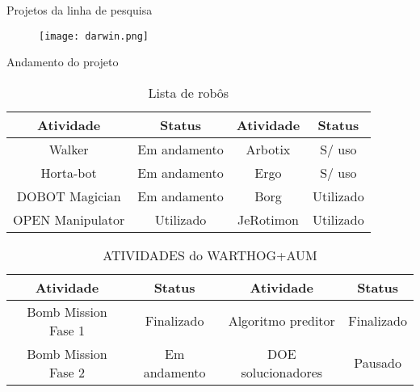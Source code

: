 \begin{frame}[t]{Projetos da linha de pesquisa }
    \begin{figure}
        \texttt{[image: darwin.png]}
    \end{figure}
\end{frame}
  \begin{frame}[c]{Andamento do projeto}
    \begin{table}[ht!]
            \caption{Lista de robôs}
            \begin{tabular}{|c|c|c|c|} \hline
                \textbf{Atividade}&\textbf{Status}&\textbf{Atividade}&\textbf{Status}\\\hline
                Walker           &Em andamento &  Arbotix & S/ uso\\ \hline
                Horta-bot        &Em andamento &  Ergo & S/ uso\\ \hline
                DOBOT Magician   &Em andamento &  Borg  & Utilizado\\ \hline
                OPEN Manipulator &Utilizado       &  JeRotimon & Utilizado\\ \hline
            \end{tabular}
        \end{table}
        \begin{table}[ht!]
                \caption{ATIVIDADES do WARTHOG+AUM}
                \begin{tabular}{|c|c|c|c|} \hline
                    \textbf{Atividade}&\textbf{Status}&\textbf{Atividade}&\textbf{Status}\\\hline
                    Bomb Mission Fase 1 &Finalizado & Algoritmo preditor  &Finalizado\\ \hline
                    Bomb Mission Fase 2 &Em andamento & DOE solucionadores &Pausado\\ \hline
                \end{tabular}
            \end{table}
\end{frame}


